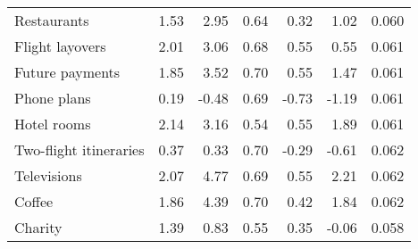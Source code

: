 \begin{tabular}[t]{lrrrrrr}
Restaurants & 1.53 & 2.95 & 0.64 & 0.32 & 1.02 & 0.060\\
Flight layovers & 2.01 & 3.06 & 0.68 & 0.55 & 0.55 & 0.061\\
\addlinespace
Future payments & 1.85 & 3.52 & 0.70 & 0.55 & 1.47 & 0.061\\
Phone plans & 0.19 & -0.48 & 0.69 & -0.73 & -1.19 & 0.061\\
Hotel rooms & 2.14 & 3.16 & 0.54 & 0.55 & 1.89 & 0.061\\
Two-flight itineraries & 0.37 & 0.33 & 0.70 & -0.29 & -0.61 & 0.062\\
Televisions & 2.07 & 4.77 & 0.69 & 0.55 & 2.21 & 0.062\\
\addlinespace
Coffee & 1.86 & 4.39 & 0.70 & 0.42 & 1.84 & 0.062\\
Charity & 1.39 & 0.83 & 0.55 & 0.35 & -0.06 & 0.058\\
\bottomrule
\end{tabular}
